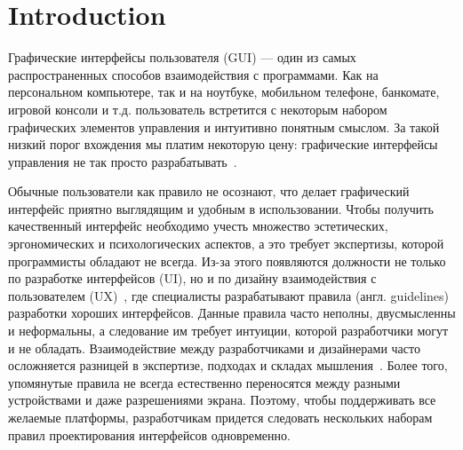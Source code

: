 


\section{Introduction}
\label{sec:intro}

Графические интерфейсы пользователя (GUI) --- один из самых распространенных способов взаимодействия с программами. Как на персональном компьютере, так и на ноутбуке, мобильном телефоне, банкомате, игровой консоли и т.д. пользователь встретится с некоторым набором графических элементов управления и интуитивно понятным смыслом. За такой низкий порог вхождения мы платим некоторую цену: графические интерфейсы управления не так просто разрабатывать~\cite{UI1,UI12}.



Обычные пользователи как правило не осознают, что делает графический интерфейс приятно выглядящим и удобным в использовании. Чтобы получить качественный интерфейс необходимо учесть множество эстетических, эргономических и психологических аспектов, а это требует экспертизы, которой программисты обладают не всегда. Из-за этого появляются должности не только по разработке интерфейсов (UI), но и по дизайну взаимодействия с пользователем (UX)~\cite{UI5}, где специалисты разрабатывают правила (англ. guidelines) разработки хороших интерфейсов. Данные правила часто неполны, двусмысленны и неформальны, а следование им требует интуиции, которой разработчики могут и не обладать.
Взаимодействие между разработчиками и дизайнерами часто осложняется разницей в экспертизе, подходах и складах мышления~\cite{UI6}. Более того, упомянутые правила не всегда естественно переносятся между разными устройствами и даже разрешениями экрана. Поэтому, чтобы поддерживать все желаемые платформы, разработчикам придется следовать нескольких наборам правил проектирования интерфейсов одновременно.

